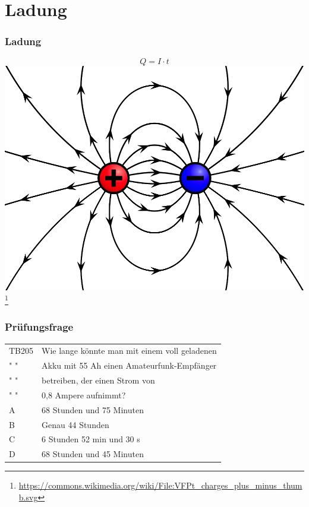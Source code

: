 \section*{Ladung}

\begin{frame}
    \frametitle{Ladung}
    \begin{center}
    		$$Q = I \cdot t$$
        \includegraphics[width=.5\textwidth]{e02/ladung.png}
        \footnote{\tiny \url{https://commons.wikimedia.org/wiki/File:VFPt_charges_plus_minus_thumb.svg}}
	\end{center}
\end{frame}

\begin{frame}
    \frametitle{Prüfungsfrage}
    \begin{center}
    \begin{tabular}{l||l}\hline
        TB205 & Wie lange könnte man mit einem voll geladenen\\
        " " & Akku mit 55 Ah einen Amateurfunk-Empfänger\\ 
        " " & betreiben, der einen Strom von\\ 
        " " & 0,8 Ampere aufnimmt?\\ \hline\hline
         A & 68 Stunden und 75 Minuten \\ \hline
         B & Genau 44 Stunden \\ \hline
         C & 6 Stunden 52 min und 30 s \\\hline
         D & 68 Stunden und 45 Minuten \\\hline
    \end{tabular}
 	\end{center}
\end{frame}

